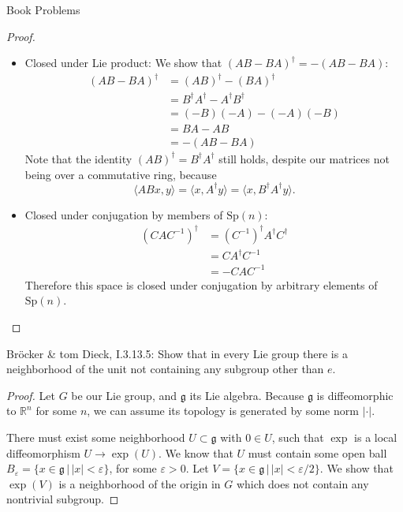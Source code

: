 \documentclass[12pt]{article}
\newcommand{\R}{\mathbb{R}}
\theoremstyle{definition}
\newenvironment{problem}[2][Problem]{\begin{trivlist}
\item[\hskip \labelsep {\bfseries #1}\hskip \labelsep {\bfseries #2.}]}{\end{trivlist}}
\begin{document}
\begin{section}{Book Problems}
\begin{problem}{1}
\begin{proof}
\begin{enumerate}[label=(\alph*)]
					\begin{itemize}
						\item Closed under Lie product: We show that $(AB - BA)^\dagger = -(AB - BA)$:
							\begin{align*}
								(AB - BA)^\dagger &= (AB)^\dagger - (BA)^\dagger\\
								&= B^\dagger A^\dagger - A^\dagger B^\dagger \\
								&= (-B)(-A) - (-A)(-B)\\
								&= BA - AB\\
								&= -(AB - BA)
							\end{align*}
							Note that the identity $(AB)^\dagger = B^\dagger A^\dagger$ still holds, despite our matrices not being over a commutative ring, because
							\[\langle AB x, y \rangle = \langle x, A^\dagger y\rangle = \langle x, B^\dagger A^\dagger y \rangle.\]
						\item Closed under conjugation by members of $\text{Sp}(n)$:
							\begin{align*}
								(CAC^{-1})^\dagger &= (C^{-1})^\dagger A^\dagger C^\dagger\\
								&= CA^\dagger C^{-1}\\
								&= -CAC^{-1}
							\end{align*}
							Therefore this space is closed under conjugation by arbitrary elements of $\text{Sp}(n)$.
					\end{itemize}
			\end{enumerate}
		\end{proof}
	\end{problem}
	\begin{problem}{2}
		Br\"ocker \& tom Dieck, I.3.13.5: Show that in every Lie group there is a neighborhood of the unit not containing any subgroup other than $e$.	
		\begin{proof}
			\par Let $G$ be our Lie group, and $\mathfrak g$ its Lie algebra. Because $\mathfrak g$ is diffeomorphic to $\R^n$ for some $n$, we can assume its topology is generated by some norm $\left \lvert { \cdot } \right \lvert $.
			\par There must exist some neighborhood $U \subset \mathfrak g$ with $0 \in U$, such that $\exp$ is a local diffeomorphism $U \to \exp(U)$. We know that $U$ must contain some open ball $B_\varepsilon = \{x \in \mathfrak g \,\lvert\, \lvert x \rvert < \varepsilon\}$, for some $\varepsilon > 0$. Let $V = \{x \in \mathfrak g \, \lvert \, \lvert x \rvert < \varepsilon / 2\}$. We show that $\exp(V)$ is a neighborhood of the origin in $G$ which does not contain any nontrivial subgroup.

\end{proof}
\end{problem}
\end{section}
\end{document}
